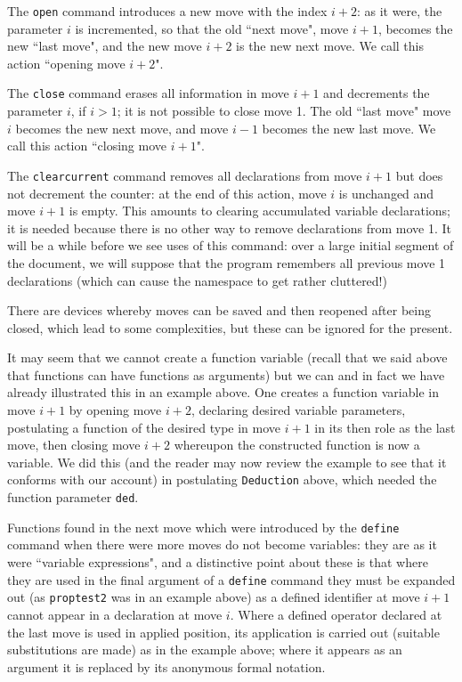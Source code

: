 \documentclass[12pt]{article}
\begin{document}
The {\tt open} command introduces a new move with the index $i+2$:  as it were, the parameter $i$ is incremented, so that the old ``next move", move $i+1$,
becomes the new ``last move", and the new move $i+2$ is the new next move.  We call this action ``opening move $i+2$".

The {\tt close} command erases all information in move $i+1$ and decrements the parameter $i$, if $i>1$;  it is not possible to close move 1.
The old ``last move" move $i$ becomes the new next move, and move $i-1$ becomes the new last move.  We call this action ``closing move $i+1$".

The {\tt clearcurrent} command removes all declarations from move $i+1$ but does not decrement the counter:  at the end of this action,
move $i$ is unchanged and move $i+1$ is empty.  This amounts to clearing accumulated variable declarations;  it is needed because there is no other way
to remove declarations from move 1.  It will be a while before we see uses of this command:  over a large initial segment of the document, we will suppose that the program remembers all previous move 1 declarations (which can cause the namespace to get rather cluttered!)

There are devices whereby moves can be saved and then reopened after being closed, which lead to some complexities, but these can be ignored for the present.

It may seem that we cannot create a function variable (recall that we said above that functions can have functions as arguments) but we can and in fact we have already illustrated this in an example above.  One creates a function variable in move $i+1$ by opening move $i+2$, declaring desired variable parameters, postulating a function of the desired type in move $i+1$ in its then role as the last move, then closing move $i+2$ whereupon the constructed function is now a variable.   We did this (and the reader may now review the example to see that it conforms with our account) in postulating {\tt Deduction} above, which needed the function parameter {\tt ded}.

Functions found in the next move which were  introduced by the {\tt define} command when there were more moves do not become variables:  they are as it were ``variable expressions", and a distinctive point about these is that where they are used in the final argument of a {\tt define} command they must be expanded out (as {\tt proptest2} was in an example above)
as a defined identifier at move $i+1$ cannot appear in a declaration at move $i$.  Where a defined operator declared at the last move is used in applied position, its application is carried out (suitable substitutions are made) as in the example above;  where it appears as an argument it is replaced by its anonymous formal notation.
\end{document}
